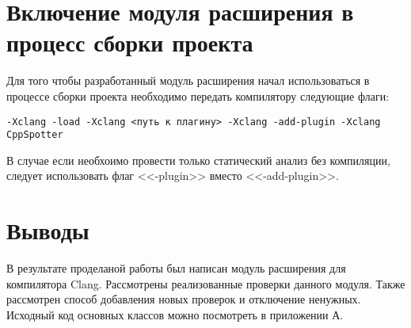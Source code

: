 \section{Включение модуля расширения в процесс сборки проекта}
Для того чтобы разработанный модуль расширения начал использоваться в процессе сборки проекта необходимо 
передать компилятору следующие флаги:
\begin{lstlisting}
-Xclang -load -Xclang <путь к плагину> -Xclang -add-plugin -Xclang CppSpotter  
\end{lstlisting}

В случае если необхоимо провести только статический анализ без компиляции, следует использовать
флаг <<-plugin>> вместо <<-add-plugin>>.

\section{Выводы}
В результате проделаной работы был написан модуль расширения для компилятора Clang. Рассмотрены 
реализованные проверки данного модуля. Также рассмотрен способ добавления новых проверок и отключение ненужных.
Исходный код основных классов можно посмотреть в приложении А.
